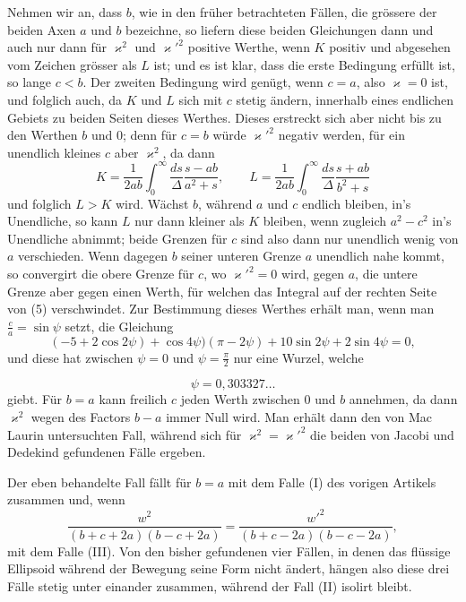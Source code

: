 \documentclass[12pt,a4paper]{article}
\begin{document}
Nehmen wir an, dass $b$, wie in den fr\"uher betrachteten F\"allen, die gr\"ossere der beiden Axen $a$ und $b$ bezeichne, so liefern diese beiden Gleichungen dann und auch nur dann f\"ur $\varkappa^{2}$ und $\varkappa'^{2}$ positive Werthe, wenn $K$ positiv und abgesehen vom Zeichen gr\"osser als $L$ ist; und es ist klar, dass die erste Bedingung erf\"ullt ist, so lange $c < b$. Der zweiten Bedingung wird gen\"ugt, wenn $c = a$, also $\varkappa = 0$ ist, und folglich auch, da $K$ und $L$ sich mit $c$ stetig \"andern, innerhalb eines endlichen Gebiets zu beiden Seiten dieses Werthes. Dieses erstreckt sich aber nicht bis zu den Werthen $b$ und $0$; denn f\"ur $c = b$ w\"urde $\varkappa'^{2}$ negativ werden, f\"ur ein unendlich kleines $c$ aber $\varkappa^{2}$, da dann
\[
K = \frac{1}{2ab}\int_{0}^{\infty}\frac{ds}{\Delta}\frac{s - ab}{a^{2} + s},\qquad L = \frac{1}{2ab}\int_{0}^{\infty}\frac{ds}{\Delta}\frac{s + ab}{b^{2} + s}
\]
und folglich $L > K$ wird. W\"achst $b$, w\"ahrend $a$ und $c$ endlich bleiben, in's Unendliche, so kann $L$ nur dann kleiner als $K$ bleiben, wenn zugleich $a^{2} - c^{2}$ in's Unendliche abnimmt; beide Grenzen f\"ur $c$ sind also dann nur unendlich wenig von $a$ verschieden. Wenn dagegen $b$ seiner unteren Grenze $a$ unendlich nahe kommt, so convergirt die obere Grenze f\"ur $c$, wo $\varkappa'^{2} = 0$ wird, gegen $a$, die untere Grenze aber gegen einen Werth, f\"ur welchen das Integral auf der rechten Seite von (5) verschwindet. Zur Bestimmung dieses Werthes erh\"alt man, wenn man $\frac{c}{a} = \sin\psi$ setzt, die Gleichung
\[
(-5 + 2\cos 2\psi) + \cos 4\psi)(\pi - 2\psi) + 10\sin 2\psi + 2\sin 4\psi = 0,
\]
und diese hat zwischen $\psi = 0$ und $\psi = \frac{\pi}{2}$ nur eine Wurzel, welche

\[
\psi = 0{,}303327\ldots
\]
giebt. F\"ur $b = a$ kann freilich $c$ jeden Werth zwischen $0$ und $b$ annehmen, da dann $\varkappa^{2}$ wegen des Factors $b - a$ immer Null wird. Man erh\"alt dann den von Mac Laurin untersuchten Fall, w\"ahrend sich f\"ur $\varkappa^{2} = \varkappa'^{2}$ die beiden von Jacobi und Dedekind gefundenen F\"alle ergeben.

Der eben behandelte Fall f\"allt f\"ur $b = a$ mit dem Falle (I) des vorigen Artikels zusammen und, wenn
\[
\frac{w^{2}}{(b+c+2a)(b-c+2a)} = \frac{w'^{2}}{(b+c-2a)(b-c-2a)},
\]
mit dem Falle (III). Von den bisher gefundenen vier F\"allen, in denen das fl\"ussige Ellipsoid w\"ahrend der Bewegung seine Form nicht \"andert, h\"angen also diese drei F\"alle stetig unter einander zusammen, w\"ahrend der Fall (II) isolirt bleibt.
\end{document}
